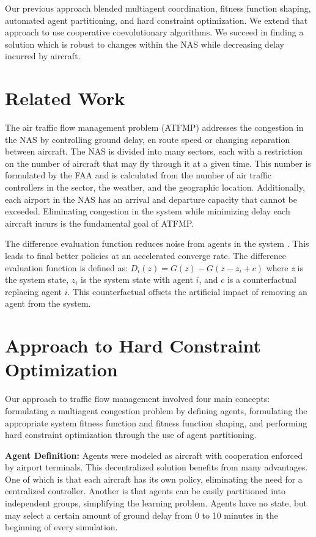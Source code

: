 \documentclass{sig-alternate}
\begin{document}
Our previous approach \cite{AAMAS13-curranw} blended multiagent coordination, fitness function shaping, automated agent partitioning, and hard constraint optimization. We extend that approach to use cooperative coevolutionary algorithms. We succeed in finding a solution which is robust to changes within the NAS while decreasing delay incurred by aircraft.

\section{Related Work}
The air traffic flow management problem (ATFMP) addresses the congestion in the NAS by controlling ground delay, en route speed or changing separation between aircraft. The NAS is divided into many sectors, each with a restriction on the number of aircraft that may fly through it at a given time. This number is formulated by the FAA and is calculated from the number of air traffic controllers in the sector, the weather, and the geographic location. Additionally, each airport in the NAS has an arrival and departure capacity that cannot be exceeded. Eliminating congestion in the system while minimizing delay each aircraft incurs is the fundamental goal of ATFMP. 

The difference evaluation function reduces noise from agents in the system \cite{tumer-wolpert_jair02}. This leads to final better policies at an accelerated converge rate. The difference evaluation function is defined as: $D_i(z) = G(z) - G(z - z_i + c)$ where \textit{z} is the system state, $z_i$ is the system state with agent $i$, and $c$ is a counterfactual replacing agent $i$. This counterfactual offsets the artificial impact of removing an agent from the system.

\section{Approach to Hard Constraint Optimization}
Our approach to traffic flow management involved four main concepts: formulating a multiagent congestion problem by defining agents, formulating the appropriate system fitness function and fitness function shaping, and performing hard constraint optimization through the use of agent partitioning.

\textbf{Agent Definition:} Agents were modeled as aircraft with cooperation enforced by airport terminals. This decentralized solution benefits from many advantages. One of which is that each aircraft has its own policy, eliminating the need for a centralized controller. Another is that agents can be easily partitioned into independent groups, simplifying the learning problem. Agents have no state, but may select a certain amount of ground delay from 0 to 10 minutes in the beginning of every simulation.
\end{document}
